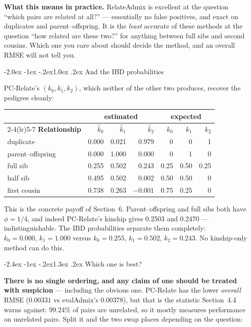 \documentclass[10pt,a4paper]{article}
\makeatletter
\renewcommand\section{\@startsection{section}{1}{\z@}%
  {-2.4ex \@plus -1ex \@minus -.2ex}{1.3ex \@plus.2ex}%
  {\normalfont\large\bfseries\color{hdr}}}
\renewcommand\subsection{\@startsection{subsection}{2}{\z@}%
  {-2.0ex \@plus -1ex \@minus -.2ex}{1.0ex \@plus.2ex}%
  {\normalfont\normalsize\bfseries\color{hdr}}}
\makeatother
\begin{document}
\textbf{What this means in practice.} RelateAdmix is excellent at the question ``which pairs are related at
all?'' --- essentially no false positives, and exact on duplicates and parent--offspring. It is the
\emph{least} accurate of these methods at the question ``how related are these two?'' for anything between
full sibs and second cousins. Which one you care about should decide the method, and an overall RMSE will not
tell you.

\subsection{And the IBD probabilities}

PC-Relate's $(k_0,k_1,k_2)$, which neither of the other two produces, recover the pedigree cleanly:

\begin{center}
\small
\begin{tabular}{@{}lrrrrrr@{}}
\toprule
& \multicolumn{3}{c}{\textbf{estimated}} & \multicolumn{3}{c}{\textbf{expected}} \\
\cmidrule(lr){2-4}\cmidrule(lr){5-7}
\textbf{Relationship} & $\hat k_0$ & $\hat k_1$ & $\hat k_2$ & $k_0$ & $k_1$ & $k_2$ \\
\midrule
duplicate         & 0.000 & 0.021 & 0.979 & 0 & 0 & 1 \\
parent--offspring & 0.000 & 1.000 & 0.000 & 0 & 1 & 0 \\
full sib          & 0.255 & 0.502 & 0.243 & 0.25 & 0.50 & 0.25 \\
half sib          & 0.495 & 0.502 & 0.002 & 0.50 & 0.50 & 0 \\
first cousin      & 0.738 & 0.263 & $-0.001$ & 0.75 & 0.25 & 0 \\
\bottomrule
\end{tabular}
\end{center}

\noindent
This is the concrete payoff of Section~6. Parent--offspring and full sibs both have $\phi=1/4$, and indeed
PC-Relate's kinship gives 0.2503 and 0.2470 --- indistinguishable. The IBD probabilities separate them
completely: $k_0=0.000,\,k_1=1.000$ versus $k_0=0.255,\,k_1=0.502,\,k_2=0.243$. No kinship-only method can
do this.

\section{Which one is best?}

\textbf{There is no single ordering, and any claim of one should be treated with suspicion} --- including
the obvious one. PC-Relate has the lower \emph{overall} RMSE ($0.00331$ vs evalAdmix's $0.00378$), but that
is the statistic Section~4.4 warns against: 99.24\% of pairs are unrelated, so it mostly measures
performance on unrelated pairs. Split it and the two swap places depending on the question:
\end{document}
